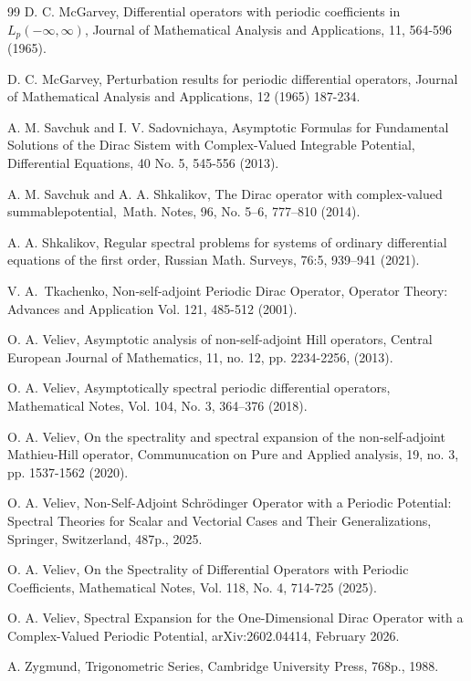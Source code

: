 \documentclass{article}%
\begin{document}
\begin{thebibliography}{99}
\bibitem {}D. C. McGarvey, Differential operators with periodic coefficients
in $L_{p}(-\infty,\infty)$, Journal of Mathematical Analysis and Applications,
{11}, 564-596 (1965).

\bibitem {}D. C. McGarvey, Perturbation results for periodic differential
operators, Journal of Mathematical Analysis and Applications, {12} (1965) 187-234.

\bibitem {}A. M. Savchuk and I. V. Sadovnichaya, Asymptotic Formulas for
Fundamental Solutions of the Dirac Sistem with Complex-Valued Integrable
Potential, Differential Equations, 40 No. 5, 545-556 (2013).

\bibitem {}A. M. Savchuk and A. A. Shkalikov, The Dirac operator with
complex-valued summablepotential,\ Math. Notes, 96, No. 5--6, 777--810 (2014).

\bibitem {}A. A. Shkalikov, Regular spectral problems for systems of ordinary
differential equations of the first order, Russian Math. Surveys, 76:5,
939--941 (2021).

\bibitem {}V. A.\ Tkachenko, Non-self-adjoint Periodic Dirac Operator,
Operator Theory: Advances and Application Vol. 121, 485-512 (2001).

\bibitem {}O. A. Veliev, Asymptotic analysis of non-self-adjoint Hill
operators, Central European Journal of Mathematics, 11, no. 12, pp. 2234-2256, (2013).

\bibitem {}O. A. Veliev, Asymptotically spectral periodic differential
operators, Mathematical Notes, Vol. 104, No. 3, 364--376 (2018).

\bibitem {}O. A. Veliev, On the spectrality and spectral expansion of the
non-self-adjoint Mathieu-Hill operator, Communucation on Pure and Applied
analysis, 19, no. 3, pp. 1537-1562 (2020).

\bibitem {}O. A. Veliev, Non-Self-Adjoint Schr\"{o}dinger Operator with a
Periodic Potential: Spectral Theories for Scalar and Vectorial Cases and Their
Generalizations, Springer, Switzerland, 487p., 2025.

\bibitem {}O. A. Veliev, On the Spectrality of Differential Operators with
Periodic Coefficients, Mathematical Notes, Vol. 118, No. 4, 714-725 (2025).

\bibitem {}O. A. Veliev, Spectral Expansion for the One-Dimensional Dirac
Operator with a Complex-Valued Periodic Potential, arXiv:2602.04414, February 2026.

\bibitem {}A. Zygmund, Trigonometric Series, Cambridge University Press,
768p., 1988.
\end{thebibliography}
\end{document}
